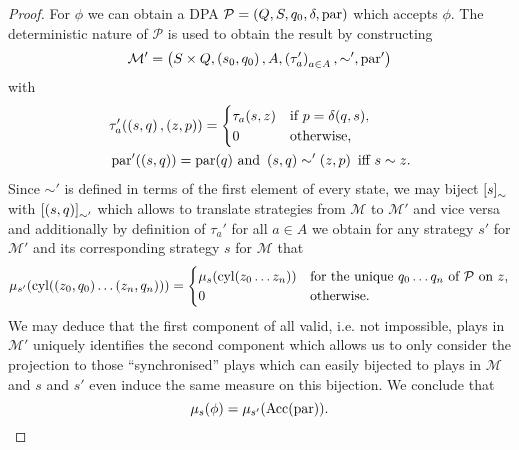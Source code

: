 \begin{proof}
  For $\phi$ we can obtain a \ac{DPA} 
  $\mathcal{P} = \left(Q, S, q_{0}, \delta, \operatorname{par}\right)$ which accepts $\phi$.
  The deterministic nature of $\mathcal{P}$ is used to obtain the result by
  constructing
  \begin{equation*}
    \mathcal{M'} = \left(S\times Q, \left(s_{0}, q_{0}\right), A, 
    \left(\tau'_{a}\right)_{a\in A}, \sim', \operatorname{par}'\right)
  \end{equation*}
  with
  \begin{align*}
    &\tau'_{a}(\left(s, q\right), \left(z, p\right)) = \begin{cases}
      \tau_{a}(s, z)&\text{if }p = \delta(q,s),\\
      0&\text{otherwise,}
    \end{cases}\\
    &\operatorname{par}'(\left(s,q\right)) = \operatorname{par}(q)
    \text{ and }
    \left(s, q\right)\sim'\left(z, p\right)\text{ iff }s\sim z.
  \end{align*}
  Since $\sim'$ is defined in terms of the first element of every state, we may
  biject $\left[s\right]_{\sim}$ with $\left[\left(s, q\right)\right]_{\sim'}$ which 
  allows to translate strategies from $\mathcal{M}$ to $\mathcal{M'}$ and vice
  versa and additionally by definition of $\tau_{a}'$ for all $a\in A$ we 
  obtain for any strategy $s'$ for $\mathcal{M'}$ and its corresponding 
  strategy $s$ for $\mathcal{M}$ that
  \begin{equation*}
    \mu_{s'}(\operatorname{cyl}(\left(z_{0}, q_{0}\right)\dots\left(z_{n}, q_{n}\right))) = 
    \begin{cases}
      \mu_{s}(\operatorname{cyl}(z_{0}\dots z_{n}))&\text{for the unique }
        q_{0}\dots q_{n}\text{ of }\mathcal{P}\text{ on }z,\\
      0&\text{otherwise.}
    \end{cases}
  \end{equation*}
  We may deduce that the first component of all valid, i.e. not impossible, 
  plays in $\mathcal{M}'$ uniquely identifies the second component which allows 
  us to only consider the projection to those \enquote{synchronised} plays 
  which can easily bijected to plays in $\mathcal{M}$ and $s$ and $s'$ even 
  induce the same measure on this bijection. We conclude that
  \begin{equation*}
    \mu_{s}(\phi) = \mu_{s'}(\operatorname{Acc}(\operatorname{par})).
  \end{equation*}
\end{proof}

